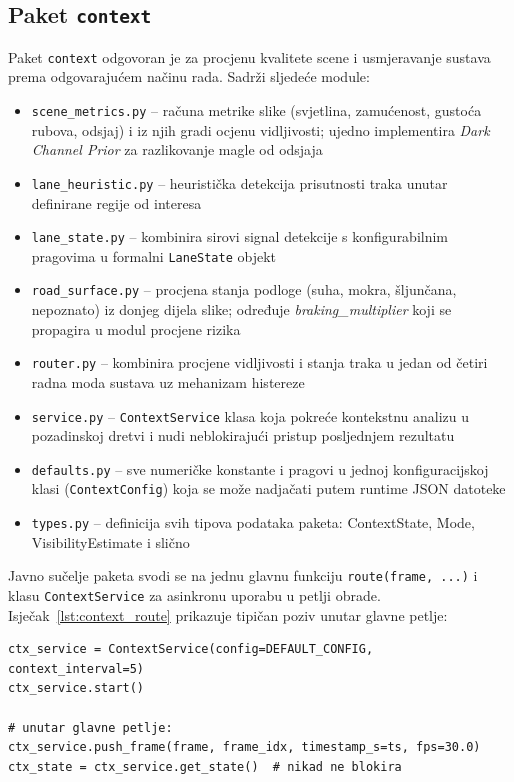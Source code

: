 \subsection{Paket \texttt{context}}

Paket \texttt{context} odgovoran je za procjenu kvalitete scene i usmjeravanje sustava prema odgovarajućem načinu rada. Sadrži sljedeće module:

\begin{itemize}
    \item \texttt{scene\_metrics.py} -- računa metrike slike (svjetlina, zamućenost, gustoća rubova, odsjaj) i iz njih gradi ocjenu vidljivosti; ujedno implementira \textit{Dark Channel Prior} za razlikovanje magle od odsjaja
    \item \texttt{lane\_heuristic.py} -- heuristička detekcija prisutnosti traka unutar definirane regije od interesa
    \item \texttt{lane\_state.py} -- kombinira sirovi signal detekcije s konfigurabilnim pragovima u formalni \texttt{LaneState} objekt
    \item \texttt{road\_surface.py} -- procjena stanja podloge (suha, mokra, šljunčana, nepoznato) iz donjeg dijela slike; određuje \textit{braking\_multiplier} koji se propagira u modul procjene rizika
    \item \texttt{router.py} -- kombinira procjene vidljivosti i stanja traka u jedan od četiri radna moda sustava uz mehanizam histereze
    \item \texttt{service.py} -- \texttt{ContextService} klasa koja pokreće kontekstnu analizu u pozadinskoj dretvi i nudi neblokirajući pristup posljednjem rezultatu
    \item \texttt{defaults.py} -- sve numeričke konstante i pragovi u jednoj konfiguracijskoj klasi (\texttt{ContextConfig}) koja se može nadjačati putem runtime JSON datoteke
    \item \texttt{types.py} -- definicija svih tipova podataka paketa: ContextState, Mode, VisibilityEstimate i slično
\end{itemize}

Javno sučelje paketa svodi se na jednu glavnu funkciju \texttt{route(frame, ...)} i klasu \texttt{ContextService} za asinkronu uporabu u petlji obrade. Isječak~\ref{lst:context_route} prikazuje tipičan poziv unutar glavne petlje:

\begin{lstlisting}[style=pycode, caption={Korištenje \texttt{ContextService} u glavnoj petlji obrade}, label={lst:context_route}]
ctx_service = ContextService(config=DEFAULT_CONFIG, context_interval=5)
ctx_service.start()

# unutar glavne petlje:
ctx_service.push_frame(frame, frame_idx, timestamp_s=ts, fps=30.0)
ctx_state = ctx_service.get_state()  # nikad ne blokira
\end{lstlisting}

